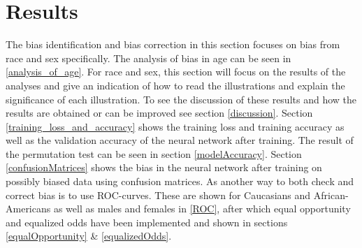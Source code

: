 \documentclass[11pt, fleqn, titlepage]{article}
\begin{document}

	
	\section{Results}\label{results}
	The bias identification and bias correction in this section focuses on bias from race and sex specifically. The analysis of bias in age can be seen in \ref{analysis_of_age}. For race and sex, this section will focus on the results of the analyses and give an indication of how to read the illustrations and explain the significance of each illustration. To see the discussion of these results and how the results are obtained or can be improved see section \ref{discussion}. Section \ref{training_loss_and_accuracy} shows the training loss and training accuracy as well as the validation accuracy of the neural network after training. The result of the permutation test can be seen in section \ref{modelAccuracy}. Section \ref{confusionMatrices} shows the bias in the neural network after training on possibly biased data using confusion matrices. As another way to both check and correct bias is to use ROC-curves. These are shown for Caucasians and African-Americans as well as males and females in \ref{ROC}, after which equal opportunity and equalized odds have been implemented and shown in sections \ref{equalOpportunity} \& \ref{equalizedOdds}.
	
\end{document}
